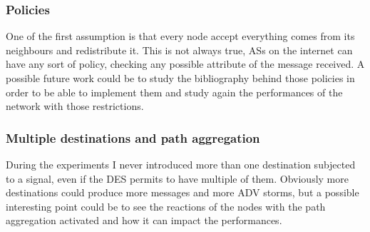 \subsubsection{Policies}

One of the first assumption is that every node accept everything comes from its
neighbours and redistribute it.
This is not always true, \acp{AS} on the internet can have any sort of policy,
checking any possible attribute of the message received.
A possible future work could be to study the bibliography behind those policies
in order to be able to implement them and study again the performances of
the network with those restrictions.

\subsubsection{Multiple destinations and path aggregation}

During the experiments I never introduced more than one destination subjected to a
signal, even if the \ac{DES} permits to have multiple of them.
Obviously more destinations could produce more messages and more \ac{ADV}
storms, but a possible interesting point could be to see the reactions of the nodes
with the path aggregation activated and how it can impact the performances.

